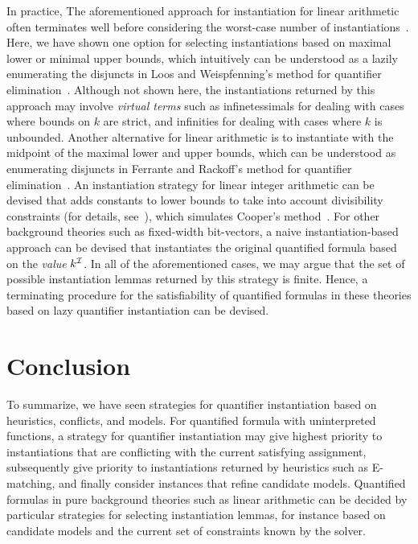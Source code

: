 \documentclass[oribibl]{llncs}
\begin{document}
In practice,
The aforementioned approach for instantiation for linear arithmetic often terminates well before considering the worst-case number of instantiations~\cite{DBLP:conf/lpar/BjornerJ15,InstLA2016}.
Here, we have shown one option for selecting instantiations based on maximal lower or minimal upper bounds,
which intuitively can be understood as a lazily enumerating the disjuncts in Loos and Weispfenning's method for quantifier elimination~\cite{Loos93applyinglinear}.
Although not shown here, the instantiations returned by this approach may involve \emph{virtual terms} such as infinetessimals for dealing with cases where bounds on $k$ are strict,
and infinities for dealing with cases where $k$ is unbounded.
Another alternative for linear arithmetic is to instantiate with the midpoint of the
maximal lower and upper bounds,
which can be understood as enumerating disjuncts in Ferrante and Rackoff's method for quantifier elimination~\cite{FerranteRackoff79ComputationalComplexityLogicalTheories}.
An instantiation strategy for linear integer arithmetic can be devised that adds constants to lower bounds to take into account divisibility constraints (for details, see~\cite{InstLA2016}),
which simulates Cooper's method~\cite{cooper1972}.
For other background theories such as fixed-width bit-vectors, 
a naive instantiation-based approach can be devised that instantiates the original quantified formula based on the \emph{value} $k^{\mathcal{I}}$.
In all of the aforementioned cases, we may argue that the set of possible instantiation lemmas returned by this strategy is finite.
Hence, a terminating procedure for the satisfiability of quantified formulas in these theories based on lazy quantifier instantiation can be devised.


\section{Conclusion}
\label{sec:conclusion}

To summarize,
we have seen strategies for quantifier instantiation
based on heuristics, conflicts, and models.
For quantified formula with uninterpreted functions,
a strategy for quantifier instantiation may give highest priority to instantiations that
are conflicting with the current satisfying assignment,
subsequently give priority to instantiations returned by heuristics such as E-matching,
and finally consider instances that refine candidate models.
Quantified formulas in pure background theories such as linear arithmetic can be 
decided by particular strategies for selecting instantiation lemmas, for instance
based on candidate models and the current set of constraints known by the solver.
\end{document}
